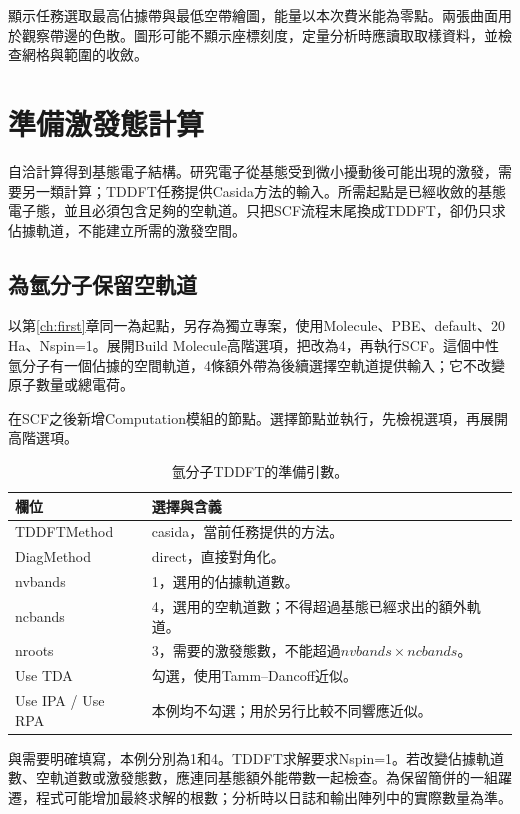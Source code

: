 顯示任務選取最高佔據帶與最低空帶繪圖，能量以本次費米能為零點。兩張曲面用於觀察帶邊的色散。圖形可能不顯示座標刻度，定量分析時應讀取取樣資料，並檢查網格與範圍的收斂。


\section{準備激發態計算}\label{sec:tddft-workflow}

自洽計算得到基態電子結構。研究電子從基態受到微小擾動後可能出現的激發，需要另一類計算；TDDFT任務提供Casida方法的輸入。所需起點是已經收斂的基態電子態，並且必須包含足夠的空軌道。只把SCF流程末尾換成TDDFT，卻仍只求佔據軌道，不能建立所需的激發空間。

\subsection{為氫分子保留空軌道}

以第\ref{ch:first}章同一為起點，另存為獨立專案，使用Molecule、PBE、default、20 Ha、Nspin=1。展開Build Molecule高階選項，把改為4，再執行SCF。這個中性氫分子有一個佔據的空間軌道，4條額外帶為後續選擇空軌道提供輸入；它不改變原子數量或總電荷。

在SCF之後新增Computation模組的節點。選擇節點並執行，先檢視選項，再展開高階選項。

\begin{table}[htbp]
\centering
\caption{氫分子TDDFT的準備引數。}
\begin{tabularx}{\linewidth}{lX}
\toprule
欄位 & 選擇與含義 \\
\midrule
TDDFTMethod & casida，當前任務提供的方法。 \\
DiagMethod & direct，直接對角化。 \\
nvbands & 1，選用的佔據軌道數。 \\
ncbands & 4，選用的空軌道數；不得超過基態已經求出的額外軌道。 \\
nroots & 3，需要的激發態數，不能超過$nvbands\times ncbands$。 \\
Use TDA & 勾選，使用Tamm--Dancoff近似。 \\
Use IPA / Use RPA & 本例均不勾選；用於另行比較不同響應近似。 \\
\bottomrule
\end{tabularx}
\end{table}

與需要明確填寫，本例分別為1和4。TDDFT求解要求Nspin=1。若改變佔據軌道數、空軌道數或激發態數，應連同基態額外能帶數一起檢查。為保留簡併的一組躍遷，程式可能增加最終求解的根數；分析時以日誌和輸出陣列中的實際數量為準。

